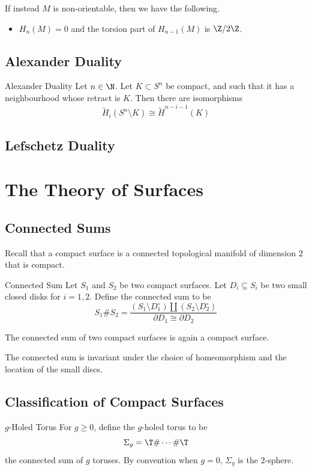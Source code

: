 \documentclass[a4paper]{article}
\begin{document}
If instead $M$ is non-orientable, then we have the following. 
\begin{itemize}
\item $H_n(M)=0$ and the torsion part of $H_{n-1}(M)$ is $\Z/2\Z$. 
\end{itemize}

\subsection{Alexander Duality}
\begin{thm}{Alexander Duality}{} Let $n\in\N$. Let $K\subset S^n$ be compact, and such that it has a neighbourhood whose retract is $K$. Then there are isomorphisms $$\widetilde{H}_i(S^n\setminus K)\cong\widetilde{H}^{n-i-1}(K)$$
\end{thm}

\subsection{Lefschetz Duality}

\pagebreak
\section{The Theory of Surfaces}
\subsection{Connected Sums}
Recall that a compact surface is a connected topological manifold of dimension $2$ that is compact. 

\begin{defn}{Connected Sum}{} Let $S_1$ and $S_2$ be two compact surfaces. Let $D_i\subseteq S_i$ be two small closed disks for $i=1,2$. Define the connected sum to be $$S_1\# S_2=\frac{(S_1\setminus D_1^\circ)\amalg(S_2\setminus D_2^\circ)}{\partial D_1\cong\partial D_2}$$
\end{defn}

\begin{lmm}{}{} The connected sum of two compact surfaces is again a compact surface. 
\end{lmm}

\begin{prp}{}{} The connected sum is invariant under the choice of homeomorphism and the location of the small discs. 
\end{prp}

\subsection{Classification of Compact Surfaces}
\begin{defn}{$g$-Holed Torus}{} For $g\geq 0$, define the $g$-holed torus to be $$\Sigma_g=\T\#\cdots\#\T$$ the connected sum of $g$ toruses. By convention when $g=0$, $\Sigma_g$ is the $2$-sphere. 
\end{defn}
\end{document}
